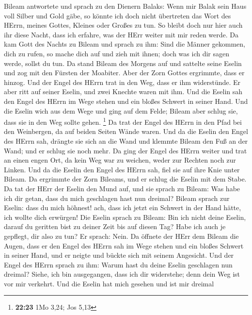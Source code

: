 Bileam antwortete und sprach zu den Dienern Balaks: Wenn mir Balak sein
Haus voll Silber und Gold gäbe, so könnte ich doch nicht übertreten das
Wort des HErrn, meines Gottes, Kleines oder Großes zu tun.
 So bleibt doch nur hier auch ihr diese Nacht, dass ich
erfahre, was der HErr weiter mit mir reden werde.  Da kam
Gott des Nachts zu Bileam und sprach zu ihm: Sind die Männer gekommen,
dich zu rufen, so mache dich auf und zieh mit ihnen; doch was ich dir
sagen werde, sollst du tun.  Da stand Bileam des Morgens
auf und sattelte seine Eselin und zog mit den Fürsten der Moabiter.
 Aber der Zorn Gottes ergrimmte, dass er hinzog. Und der
Engel des HErrn trat in den Weg, dass er ihm widerstünde. Er aber ritt
auf seiner Eselin, und zwei Knechte waren mit ihm.  Und
die Eselin sah den Engel des HErrn im Wege stehen und ein bloßes Schwert
in seiner Hand. Und die Eselin wich aus dem Wege und ging auf dem Felde;
Bileam aber schlug sie, dass sie in den Weg sollte gehen. \footnote{\textbf{22:23}
  1Mo 3,24; Jos 5,13}  Da trat der Engel des HErrn in den
Pfad bei den Weinbergen, da auf beiden Seiten Wände waren.
 Und da die Eselin den Engel des HErrn sah, drängte sie
sich an die Wand und klemmte Bileam den Fuß an der Wand; und er schlug
sie noch mehr.  Da ging der Engel des HErrn weiter und
trat an einen engen Ort, da kein Weg war zu weichen, weder zur Rechten
noch zur Linken.  Und da die Eselin den Engel des HErrn
sah, fiel sie auf ihre Knie unter Bileam. Da ergrimmte der Zorn Bileams,
und er schlug die Eselin mit dem Stabe.  Da tat der HErr
der Eselin den Mund auf, und sie sprach zu Bileam: Was habe ich dir
getan, dass du mich geschlagen hast nun dreimal?  Bileam
sprach zur Eselin: dass du mich höhnest! ach, dass ich jetzt ein Schwert
in der Hand hätte, ich wollte dich erwürgen!  Die Eselin
sprach zu Bileam: Bin ich nicht deine Eselin, darauf du geritten bist zu
deiner Zeit bis auf diesen Tag? Habe ich auch je gepflegt, dir also zu
tun? Er sprach: Nein.  Da öffnete der HErr dem Bileam die
Augen, dass er den Engel des HErrn sah im Wege stehen und ein bloßes
Schwert in seiner Hand, und er neigte und bückte sich mit seinem
Angesicht.  Und der Engel des HErrn sprach zu ihm: Warum
hast du deine Eselin geschlagen nun dreimal? Siehe, ich bin ausgegangen,
dass ich dir widerstehe; denn dein Weg ist vor mir verkehrt.
 Und die Eselin hat mich gesehen und ist mir dreimal
